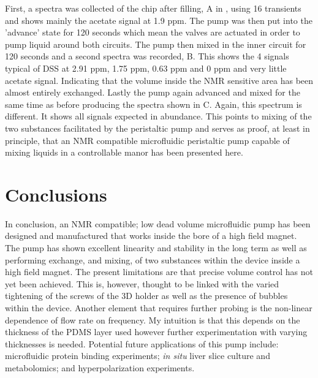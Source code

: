 First, a spectra was collected of the chip after filling, A in , using 16
transients and shows mainly the acetate signal at 1.9 ppm. The pump was then put into
the 'advance' state for 120 seconds which mean the valves are actuated in order to pump
liquid around both circuits. The pump then mixed in the inner circuit for 120 seconds
and a second spectra was recorded, B. This shows the 4 signals typical of DSS at 2.91
ppm, 1.75 ppm, 0.63 ppm and 0 ppm and very little acetate signal. Indicating that the
volume inside the NMR sensitive area has been almost entirely exchanged. Lastly the
pump again advanced and mixed for the same time as before producing the spectra shown
in C. Again, this spectrum is different. It shows all signals expected in abundance.
This points to mixing of the two substances facilitated by the peristaltic pump and serves
as proof, at least in principle, that an NMR compatible microfluidic peristaltic pump
capable of mixing liquids in a controllable manor has been presented here.

\section{Conclusions}

In conclusion, an NMR compatible; low dead volume microfluidic pump has been designed and
manufactured that works inside the bore of a high field magnet. The pump has shown
excellent linearity and stability in the long term as well as performing exchange, and
mixing, of two substances within the device inside a high field magnet. The present limitations
are that precise volume control has not yet been achieved. This is, however, thought to be linked
with the varied tightening of the screws of the 3D holder as well as the presence of bubbles
within the device. Another element that requires further probing is the non-linear dependence of
flow rate on frequency. My intuition is that this depends on the thickness of the PDMS layer
used
however further experimentation with varying thicknesses is needed. Potential future
applications
of this pump include: microfluidic protein binding experiments; \textit{in situ} liver slice
culture and metabolomics; and hyperpolarization experiments.
